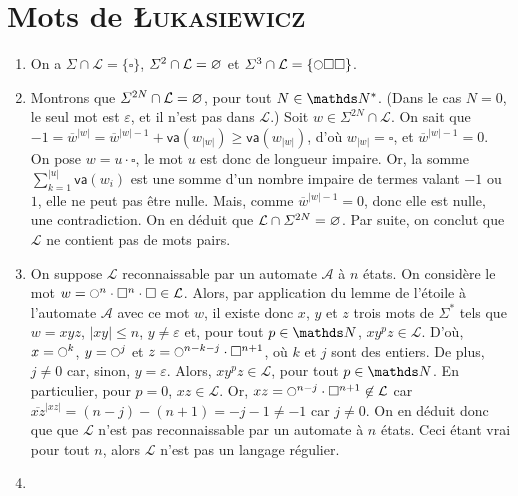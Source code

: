 \section{Mots de \textsc{\L ukasiewicz}}

\begin{enumerate}
	\item On a $\Sigma \cap \mathcal{L} = \{\square\} $, $\varSigma^2 \cap \mathcal{L} = \varnothing$\/ et $\Sigma^3 \cap \mathcal{L} = \{\circle\square\square\}$.
	\item Montrons que $\varSigma^{2N} \cap \mathcal{L} = \varnothing$, pour tout $N \in \N^*$. (Dans le cas $N = 0$, le seul mot est $\varepsilon$, et il n'est pas dans $\mathcal{L}$.)
		Soit $w \in \Sigma^{2N} \cap \mathcal{L}$.
		On sait que $-1 = \overline{w}^{|w|} = \overline{w}^{|w|-1} + \textsf{va}(w_{|w|}) \ge \textsf{va}(w_{|w|})$, d'où $w_{|w|} = \square$, et $\overline{w}^{|w| - 1} = 0$.
		On pose $w = u \cdot \square$, le mot $u$ est donc de longueur impaire.
		Or, la somme $\sum_{k=1}^{|u|} \textsf{va}(w_i)$ est une somme d'un nombre impaire de termes valant $-1$ ou $1$, elle ne peut pas être nulle.
		Mais, comme $\overline{w}^{|w| - 1} = 0$, donc elle est nulle, une contradiction.
		On en déduit que $\mathcal{L} \cap \varSigma^{2N} = \varnothing$.
		Par suite, on conclut que $\mathcal{L}$ ne contient pas de mots pairs.
	\item On suppose $\mathcal{L}$ reconnaissable par un automate $\mathcal{A}$ à $n$ états.
		On considère le mot $w = \circle^n \cdot \square^n \cdot \square \in \mathcal{L}$.
		Alors, par application du lemme de l'étoile à l'automate $\mathcal{A}$ avec ce mot $w$, il existe donc $x$, $y$ et $z$ trois mots de $\Sigma^*$ tels que $w = xyz$, $|xy| \le n$, $y \neq \varepsilon$ et, pour tout $p \in \N$, $xy^pz \in \mathcal{L}$.
		D'où, $x = \circle^k$, $y = \circle^j$ et $z = \circle^{n-k-j}\cdot \square^{n+1}$, où $k$ et $j$ sont des entiers.
		De plus, $j \neq 0$ car, sinon, $y = \varepsilon$.
		Alors, $xy^pz \in \mathcal{L}$, pour tout $p \in \N$.
		En particulier, pour $p = 0$, $xz \in \mathcal{L}$.
		Or, $xz = \circle^{n-j}\cdot \square^{n+1} \not\in \mathcal{L}$ car $\overline{xz}^{|xz|} = (n-j) - (n+1) = -j - 1 \neq -1$ car $j \neq 0$.
		On en déduit donc que que $\mathcal{L}$ n'est pas reconnaissable par un automate à $n$ états.
		Ceci étant vrai pour tout $n$, alors $\mathcal{L}$ n'est pas un langage régulier.
	\item~
		\begin{lstlisting}[language=caml,caption=Fonction \texttt{est\_luka} testant si $w$ est un mot de \L ukasiewicz]

\end{lstlisting}
\end{enumerate}
